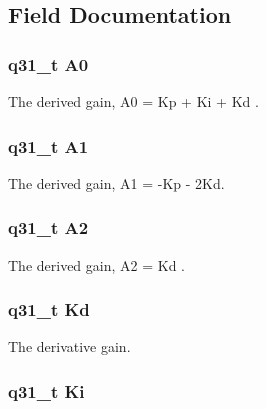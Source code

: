 \subsection{Field Documentation}
\hypertarget{structarm__pid__instance__q31_ab58496a4137da4c667915a5fc0ef57ef}{
\subsubsection[{A0}]{\setlength{\rightskip}{0pt plus 5cm}q31\-\_\-t A0}}\label{structarm__pid__instance__q31_ab58496a4137da4c667915a5fc0ef57ef}
The derived gain, A0 = Kp + Ki + Kd . \hypertarget{structarm__pid__instance__q31_aeb897c84724b56948e4222aca8d0e1f4}{
\subsubsection[{A1}]{\setlength{\rightskip}{0pt plus 5cm}q31\-\_\-t A1}}\label{structarm__pid__instance__q31_aeb897c84724b56948e4222aca8d0e1f4}
The derived gain, A1 = -\/\-Kp -\/ 2\-Kd. \hypertarget{structarm__pid__instance__q31_a4ae945f839719fb2c04c978724b78ebb}{
\subsubsection[{A2}]{\setlength{\rightskip}{0pt plus 5cm}q31\-\_\-t A2}}\label{structarm__pid__instance__q31_a4ae945f839719fb2c04c978724b78ebb}
The derived gain, A2 = Kd . \hypertarget{structarm__pid__instance__q31_a213bbf14da7ea536998f611977173552}{
\subsubsection[{Kd}]{\setlength{\rightskip}{0pt plus 5cm}q31\-\_\-t Kd}}\label{structarm__pid__instance__q31_a213bbf14da7ea536998f611977173552}
The derivative gain. \hypertarget{structarm__pid__instance__q31_a84a6c05c16369c905193da0d5fc9a7b0}{
\subsubsection[{Ki}]{\setlength{\rightskip}{0pt plus 5cm}q31\-\_\-t Ki}}\label{structarm__pid__instance__q31_a84a6c05c16369c905193da0d5fc9a7b0}
